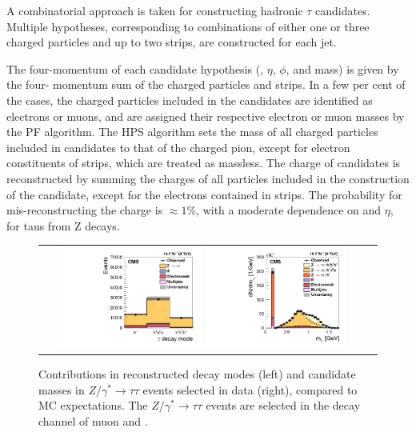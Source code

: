 A combinatorial approach is taken for constructing hadronic \ensuremath{\tau} candidates. Multiple \hadtau hypotheses, corresponding to combinations of either one or three charged particles and up to two strips, are constructed for each jet.

The four-momentum of each \hadtau candidate hypothesis (\pt, \ensuremath{\eta}, \ensuremath{\phi}, and mass) is given by the four- momentum sum of the charged particles and strips. In a few per cent of the cases, the charged particles included in the \hadtau candidates are identified as electrons or muons, and are assigned their respective electron or muon masses by the PF algorithm. The HPS algorithm sets the mass of all charged particles included in \hadtau candidates to that of the charged pion, except for electron constituents of strips, which are treated as massless. The charge of \hadtau candidates is reconstructed by summing the charges of all particles included in the construction of the \hadtau candidate, except for the electrons contained in strips. The probability for mis-reconstructing the \hadtau charge is \ensuremath{\approx 1 \%}, with a moderate dependence on \pt and \ensuremath{\eta}, for taus from Z decays.

\begin{figure}[tbh!]
	\centering
	\begin{tabular}{cc}
		\includegraphics[width=0.45\textwidth]{objreconstruction/pics/scalefactors050314.png}
		\includegraphics[width=0.45\textwidth]{objreconstruction/pics/plots_paper_tauIdAlgorithm_ZTT_mTau_ZTT_linear.png} 		
	\end{tabular}
	\caption{Contributions in reconstructed \hadtau decay modes  (left) and \hadtau candidate masses in \ensuremath{Z/\gamma^{*} \longrightarrow \tau\tau}  events selected in data (right), compared to MC expectations. The \ensuremath{Z/\gamma^{*} \longrightarrow \tau\tau}  events are selected in the decay channel of muon and \hadtau \cite{Khachatryan:2015dfa}.}
	\label{fig:Ztautau_decaymodes}
\end{figure}

